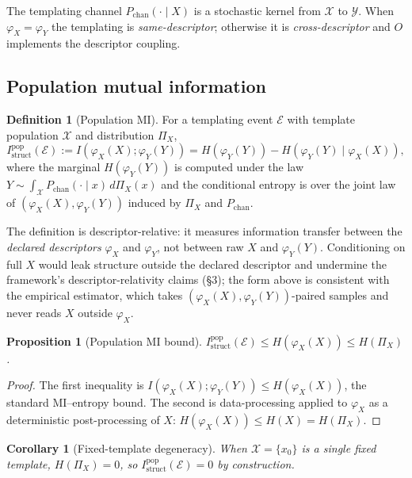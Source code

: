 \documentclass[11pt]{article}
\theoremstyle{plain}
\newtheorem{proposition}[theorem]{Proposition}
\newtheorem{corollary}[theorem]{Corollary}
\theoremstyle{definition}
\newtheorem{definition}[theorem]{Definition}
\newcommand{\Istructpop}{I_{\mathrm{struct}}^{\mathrm{pop}}}
\newcommand{\descX}{\varphi_X}
\newcommand{\descY}{\varphi_Y}
\begin{document}
The templating channel $P_{\mathrm{chan}}(\cdot \mid X)$ is a stochastic kernel from $\mathcal{X}$ to $\mathcal{Y}$. When $\descX = \descY$ the templating is \emph{same-descriptor}; otherwise it is \emph{cross-descriptor} and $O$ implements the descriptor coupling.

\subsection{Population mutual information}

\begin{definition}[Population MI]
For a templating event $\mathcal{E}$ with template population $\mathcal{X}$ and distribution $\Pi_X$,
\[
\Istructpop(\mathcal{E}) := I(\descX(X); \descY(Y)) = H(\descY(Y)) - H(\descY(Y) \mid \descX(X)),
\]
where the marginal $H(\descY(Y))$ is computed under the law $Y \sim \int_\mathcal{X} P_{\mathrm{chan}}(\cdot \mid x) \, d\Pi_X(x)$ and the conditional entropy is over the joint law of $(\descX(X), \descY(Y))$ induced by $\Pi_X$ and $P_{\mathrm{chan}}$.
\end{definition}

The definition is descriptor-relative: it measures information transfer between the \emph{declared descriptors} $\descX$ and $\descY$, not between raw $X$ and $\descY(Y)$. Conditioning on full $X$ would leak structure outside the declared descriptor and undermine the framework's descriptor-relativity claims (§3); the form above is consistent with the empirical estimator, which takes $(\descX(X), \descY(Y))$-paired samples and never reads $X$ outside $\descX$.

\begin{proposition}[Population MI bound]
\label{prop:pop_bound}
$\Istructpop(\mathcal{E}) \le H(\descX(X)) \le H(\Pi_X)$.
\end{proposition}

\begin{proof}
The first inequality is $I(\descX(X); \descY(Y)) \le H(\descX(X))$, the standard MI--entropy bound. The second is data-processing applied to $\descX$ as a deterministic post-processing of $X$: $H(\descX(X)) \le H(X) = H(\Pi_X)$.
\end{proof}

\begin{corollary}[Fixed-template degeneracy]
\label{cor:fixed_template}
When $\mathcal{X} = \{x_0\}$ is a single fixed template, $H(\Pi_X) = 0$, so $\Istructpop(\mathcal{E}) = 0$ by construction.
\end{corollary}
\end{document}
